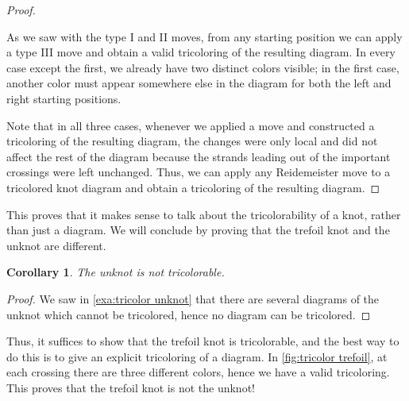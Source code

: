 \documentclass{article}
\newtheorem{cor}[thm]{Corollary}
\theoremstyle{definition}
\theoremstyle{remark}
\begin{document}
\begin{proof}
\begin{center}
	\end{center}
	
	As we saw with the type I and II moves, from any starting position we can apply a type III move and obtain a valid tricoloring of the resulting diagram. In every case except the first, we already have two distinct colors visible; in the first case, another color must appear somewhere else in the diagram for both the left and right starting positions.
	
	Note that in all three cases, whenever we applied a move and constructed a tricoloring of the resulting diagram, the changes were only local and did not affect the rest of the diagram because the strands leading out of the important crossings were left unchanged. Thus, we can apply any Reidemeister move to a tricolored knot diagram and obtain a tricoloring of the resulting diagram.
\end{proof}

This proves that it makes sense to talk about the tricolorability of a knot, rather than just a diagram. We will conclude by proving that the trefoil knot and the unknot are different.

\begin{cor}
	The unknot is not tricolorable.
\end{cor}

\begin{proof}
	We saw in \cref{exa:tricolor unknot} that there are several diagrams of the unknot which cannot be tricolored, hence no diagram can be tricolored.
\end{proof}

Thus, it suffices to show that the trefoil knot is tricolorable, and the best way to do this is to give an explicit tricoloring of a diagram. In \cref{fig:tricolor trefoil}, at each crossing there are three different colors, hence we have a valid tricoloring. This proves that the trefoil knot is not the unknot!
\end{document}
